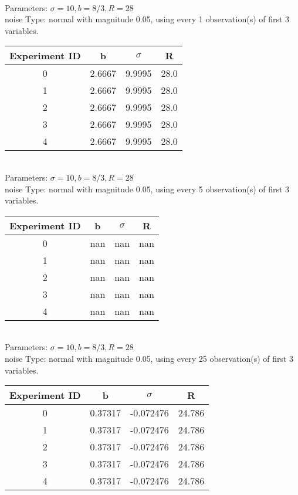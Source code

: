 \begin{multicols}{3}
\begin{tabular}{cccc}
 \end{tabular}\\
Parameters: $\sigma=10, b=8/3, R=28$\\
noise Type: normal with magnitude 0.05, using every 1 observation(s) of first 3 variables.\\
\begin{tabular}{cccc}
\hline Experiment ID & b & $\sigma$ & R \\ \hline 
0 & 2.6667 & 9.9995 & 28.0\\ \hline 
 1 & 2.6667 & 9.9995 & 28.0\\ \hline 
 2 & 2.6667 & 9.9995 & 28.0\\ \hline 
 3 & 2.6667 & 9.9995 & 28.0\\ \hline 
 4 & 2.6667 & 9.9995 & 28.0\\ \hline 
 \end{tabular}\\
Parameters: $\sigma=10, b=8/3, R=28$\\
noise Type: normal with magnitude 0.05, using every 5 observation(s) of first 3 variables.\\
\begin{tabular}{cccc}
\hline Experiment ID & b & $\sigma$ & R \\ \hline 
0 & nan & nan & nan\\ \hline 
 1 & nan & nan & nan\\ \hline 
 2 & nan & nan & nan\\ \hline 
 3 & nan & nan & nan\\ \hline 
 4 & nan & nan & nan\\ \hline 
 \end{tabular}\\
Parameters: $\sigma=10, b=8/3, R=28$\\
noise Type: normal with magnitude 0.05, using every 25 observation(s) of first 3 variables.\\
\begin{tabular}{cccc}
\hline Experiment ID & b & $\sigma$ & R \\ \hline 
0 & 0.37317 & -0.072476 & 24.786\\ \hline 
 1 & 0.37317 & -0.072476 & 24.786\\ \hline 
 2 & 0.37317 & -0.072476 & 24.786\\ \hline 
 3 & 0.37317 & -0.072476 & 24.786\\ \hline 
 4 & 0.37317 & -0.072476 & 24.786\\ \hline 
 \end{tabular}\\

\end{multicols}
